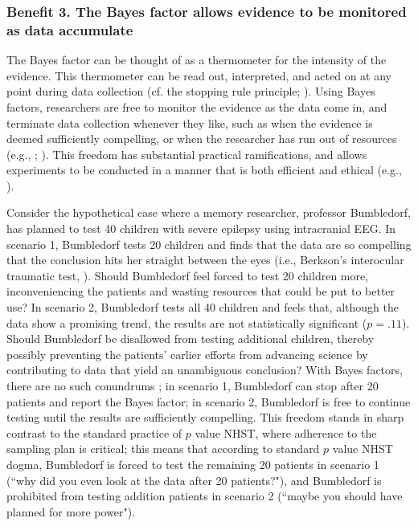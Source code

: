 \subsubsection{Benefit 3. The Bayes factor allows evidence to be monitored as data accumulate}
The Bayes factor can be thought of as a thermometer for the intensity of the evidence. This thermometer can be read out, interpreted, and acted on at any point during data collection (cf. the stopping rule principle; ). Using Bayes factors, researchers are free to monitor the evidence as the data come in, and terminate data collection whenever they like, such as when the evidence is deemed sufficiently compelling, or when the researcher has run out of resources (e.g., ; ). This freedom has substantial practical ramifications, and allows experiments to be conducted in a manner that is both efficient and ethical (e.g., ).

Consider the hypothetical case where a memory researcher, professor Bumbledorf, has planned to test 40 children with severe epilepsy using intracranial EEG. In scenario 1, Bumbledorf tests 20 children and finds that the data are so compelling that the conclusion hits her straight between the eyes (i.e., Berkson's interocular traumatic test, ). Should Bumbledorf feel forced to test 20 children more, inconveniencing the patients and wasting resources that could be put to better use? In scenario 2, Bumbledorf tests all 40 children and feels that, although the data show a promising trend, the results are not statistically significant ($p=.11$). Should Bumbledorf be disallowed from testing additional children, thereby possibly preventing the patients' earlier efforts from advancing science by contributing to data that yield an unambiguous conclusion? With Bayes factors, there are no such conundrums \cite{BergerMortera1999}; in scenario 1, Bumbledorf can stop after 20 patients and report the Bayes factor; in scenario 2, Bumbledorf is free to continue testing until the results are sufficiently compelling. This freedom stands in sharp contrast to the standard practice of $p$ value NHST, where adherence to the sampling plan is critical; this means that according to standard $p$ value NHST dogma, Bumbledorf is forced to test the remaining 20 patients in scenario 1 (``why did you even look at the data after 20 patients?"), and Bumbledorf is prohibited from testing addition patients in scenario 2 (``maybe you should have planned for more power").

